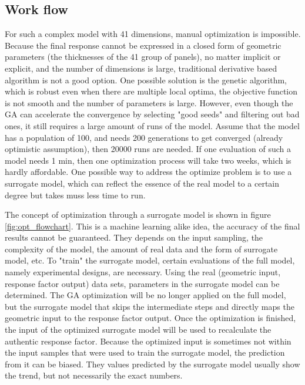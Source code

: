 \subsection{Work flow}
For such a complex model with 41 dimensions, manual optimization is impossible. Because the final response cannot be expressed in a closed form of geometric parameters (the thicknesses of the 41 group of panels), no matter implicit or explicit, and the number of dimensions is large, traditional derivative based algorithm is not a good option. One possible solution is the genetic algorithm, which is robust even when there are multiple local optima, the objective function is not smooth and the number of parameters is large. However, even though the GA can accelerate the convergence by selecting "good seeds" and filtering out bad ones, it still requires a large amount of runs of the model. Assume that the model has a population of 100, and needs 200 generations to get converged (already optimistic assumption), then 20000 runs are needed. If one evaluation of such a model needs 1 min, then one optimization process will take two weeks, which is hardly affordable. One possible way to address the optimize problem is to use a surrogate model, which can reflect the essence of the real model to a certain degree but takes muss less time to run.

The concept of optimization through a surrogate model is shown in figure \ref{fig:opt_flowchart}. This is a machine learning alike idea, the accuracy of the final results cannot be guaranteed. They depends on the input sampling, the complexity of the model, the amount of real data and the form of surrogate model, etc. To "train" the surrogate model, certain evaluations of the full model, namely experimental designs, are necessary. Using the real (geometric input, response factor output) data sets, parameters in the surrogate model can be determined. The GA optimization will be no longer applied on the full model, but the surrogate model that skips the intermediate steps and directly maps the geometric input to the response factor output. Once the optimization is finished, the input of the optimized surrogate model will be used to recalculate the authentic response factor. Because the optimized input is sometimes not within the input samples that were used to train the surrogate model, the prediction from it can be biased. They values predicted by the surrogate model usually show the trend, but not necessarily the exact numbers. 

